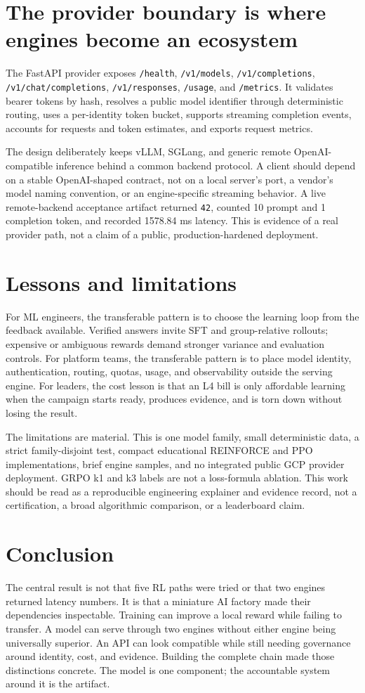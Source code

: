 \documentclass[10pt]{article}
\begin{document}
\section{The provider boundary is where engines become an ecosystem}
The FastAPI provider exposes \texttt{/health}, \texttt{/v1/models}, \texttt{/v1/completions}, \texttt{/v1/chat/completions}, \texttt{/v1/responses}, \texttt{/usage}, and \texttt{/metrics}. It validates bearer tokens by hash, resolves a public model identifier through deterministic routing, uses a per-identity token bucket, supports streaming completion events, accounts for requests and token estimates, and exports request metrics.

The design deliberately keeps vLLM, SGLang, and generic remote OpenAI-compatible inference behind a common backend protocol. A client should depend on a stable OpenAI-shaped contract, not on a local server's port, a vendor's model naming convention, or an engine-specific streaming behavior. A live remote-backend acceptance artifact returned \texttt{42}, counted 10 prompt and 1 completion token, and recorded 1578.84 ms latency. This is evidence of a real provider path, not a claim of a public, production-hardened deployment.

\section{Lessons and limitations}
For ML engineers, the transferable pattern is to choose the learning loop from the feedback available. Verified answers invite SFT and group-relative rollouts; expensive or ambiguous rewards demand stronger variance and evaluation controls. For platform teams, the transferable pattern is to place model identity, authentication, routing, quotas, usage, and observability outside the serving engine. For leaders, the cost lesson is that an L4 bill is only affordable learning when the campaign starts ready, produces evidence, and is torn down without losing the result.

The limitations are material. This is one model family, small deterministic data, a strict family-disjoint test, compact educational REINFORCE and PPO implementations, brief engine samples, and no integrated public GCP provider deployment. GRPO k1 and k3 labels are not a loss-formula ablation. This work should be read as a reproducible engineering explainer and evidence record, not a certification, a broad algorithmic comparison, or a leaderboard claim.

\section{Conclusion}
The central result is not that five RL paths were tried or that two engines returned latency numbers. It is that a miniature AI factory made their dependencies inspectable. Training can improve a local reward while failing to transfer. A model can serve through two engines without either engine being universally superior. An API can look compatible while still needing governance around identity, cost, and evidence. Building the complete chain made those distinctions concrete. The model is one component; the accountable system around it is the artifact.
\end{document}
